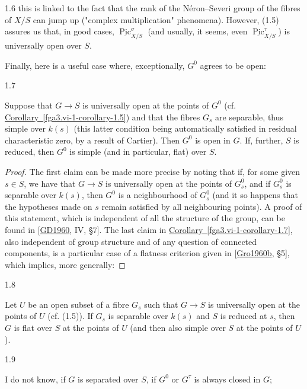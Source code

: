 \begin{remark}{1.6}
    this is linked to the fact that the rank of the Néron–Severi group of the fibres of \(X/S\) can jump up ("complex multiplication" phenomena).
    However, (1.5) assures us that, in good cases, \(\underline {\operatorname {Pic}}_{X/S}^\sigma \) (and usually, it seems, even \(\underline {\operatorname {Pic}}_{X/S}^\tau \)) is universally open over \(S\).\end{remark}\par{}Finally, here is a useful case where, exceptionally, \(G^0\) agrees to be open:\begin{corollary}{1.7}\label{fga3.vi-1-corollary-1.7}\skipsinglepar\par{}Suppose that \(G\to  S\) is universally open at the points of \(G^0\) (cf. \hyperref[fga3.vi-1-corollary-1.5]{Corollary~\ref*{fga3.vi-1-corollary-1.5}}) and that the fibres \(G_s\) are separable, thus simple over \(k(s)\) (this latter condition being automatically satisfied in residual characteristic zero, by a result of Cartier).
    Then \(G^0\) is open in \(G\).
    If, further, \(S\) is reduced, then \(G^0\) is simple (and in particular, flat) over \(S\).\begin{proof}\par{}The first claim can be made more precise by noting that if, for some given \(s\in  S\), we have that \(G\to  S\) is universally open at the points of \(G_s^0\), and if \(G_s^0\) is separable over \(k(s)\), then \(G^0\) is a neighbourhood of \(G_s^0\) (and it so happens that the hypotheses made on \(s\) remain satisfied by all neighbouring points).
      A proof of this statement, which is independent of all the structure of the group, can be found in [\hyperref[GD1960]{GD1960}, IV, §7].
      The last claim in \hyperref[fga3.vi-1-corollary-1.7]{Corollary~\ref*{fga3.vi-1-corollary-1.7}}, also independent of group structure and of any question of connected components, is a particular case of a flatness criterion given in [\hyperref[Gro1960b]{Gro1960b}, §5], which implies, more generally:\end{proof}\end{corollary}\begin{corollary}{1.8}\label{fga3.vi-1-corollary-1.8}\skipsinglepar\par{}Let \(U\) be an open subset of a fibre \(G_s\) such that \(G\to  S\) is universally open at the points of \(U\) (cf. (1.5)).
    If \(G_s\) is separable over \(k(s)\) and \(S\) is reduced at \(s\), then \(G\) is flat over \(S\) at the points of \(U\) (and then also simple over \(S\) at the points of \(U\)).\end{corollary}\begin{remarks}{1.9}\label{fga3.vi-1-remarks-1.9}\skipsinglepar\par{}I do not know, if \(G\) is separated over \(S\), if \(G^0\) or \(G^\tau \) is always closed in \(G\);

\end{remarks}
